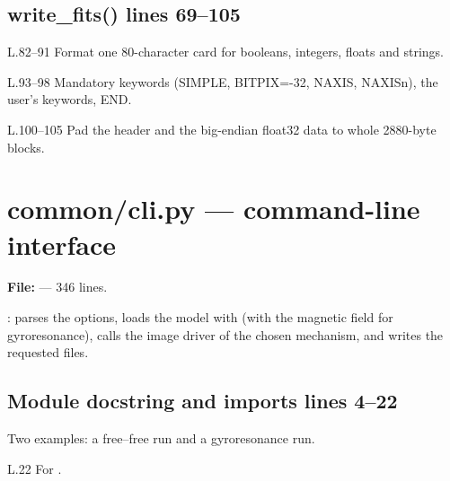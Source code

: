 \section*{\normalsize write\_fits() \hfill{\small\mdseries\color{gray}lines 69--105}}

\begin{lines}
\item[L.82–91] Format one 80-character card for booleans, integers, floats and strings.
\item[L.93–98] Mandatory keywords (SIMPLE, BITPIX=-32, NAXIS, NAXISn), the user's keywords, END.
\item[L.100–105] Pad the header and the big-endian float32 data to whole 2880-byte blocks.
\end{lines}

\chapter{common/cli.py --- command-line interface}
\label{mod:common:cli.py}
\textbf{File:}  --- 346 lines.

: parses the options, loads the model with
 (with the magnetic field for gyroresonance), calls the image driver of the
chosen mechanism, and writes the requested files.

\section*{\normalsize Module docstring and imports \hfill{\small\mdseries\color{gray}lines 4--22}}

Two examples: a free--free run and a gyroresonance run.

\begin{lines}
\item[L.22] For .
\end{lines}
